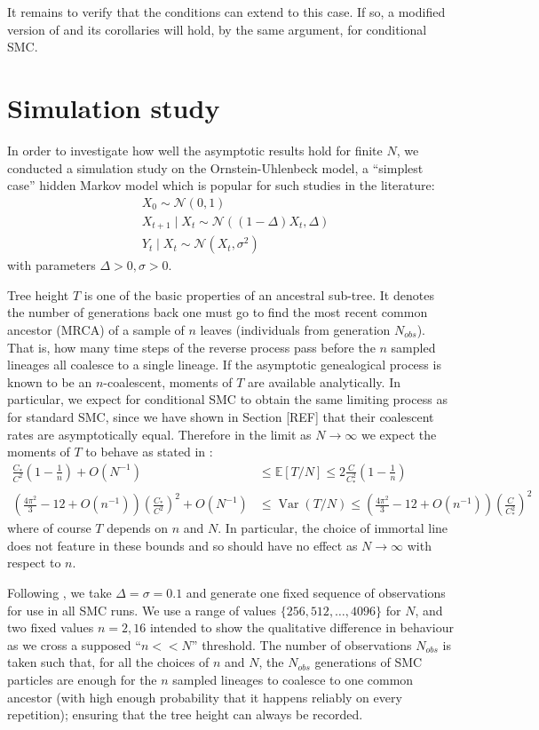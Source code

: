\documentclass{article}
\newcommand{\E}{\mathbb{E}}
\newcommand{\V}{\operatorname{Var}}
\newcommand{\N}{\mathcal{N}}
\begin{document}
It remains to verify that the conditions \citep[(3)--(4)]{koskela2018} can extend to this case. If so, a modified version of \citet[Theorem 1]{koskela2018} and its corollaries will hold, by the same argument, for conditional SMC.

\section{Simulation study}\label{sec:simulations}
In order to investigate how well the asymptotic results hold for finite $N$, we conducted a simulation study on the Ornstein-Uhlenbeck model, a ``simplest case'' hidden Markov model which is popular for such studies in the literature:
\begin{align*}
& X_0 \sim \N(0,1) \\
& X_{t+1} \mid X_t \sim \N((1-\Delta)X_t, \Delta) \\
& Y_t \mid X_{t} \sim \N(X_t, \sigma^2)
\end{align*}
with parameters $\Delta >0, \sigma >0$.

Tree height $T$ is one of the basic properties of an ancestral sub-tree. It denotes the number of generations back one must go to find the most recent common ancestor (MRCA) of a sample of $n$ leaves (individuals from generation $N_{obs}$). That is, how many time steps of the reverse process pass before the $n$ sampled lineages all coalesce to a single lineage. If the asymptotic genealogical process is known to be an $n$-coalescent, moments of $T$ are available analytically. In particular, we expect for conditional SMC to obtain the same limiting process as for standard SMC, since we have shown in Section [REF] that their coalescent rates are asymptotically equal. Therefore in the limit as $N\to\infty$ we expect the moments of $T$ to behave as stated in \citet[Corollary 1]{koskela2018}:
\begin{align*}
\frac{C_*}{C^2} \left(1-\frac{1}{n}\right) + O(N^{-1}) &\leq \E[T/N] \leq 2\frac{C}{C_*^2} \left(1-\frac{1}{n}\right) \\
\left(\frac{4\pi^2}{3} - 12 + O(n^{-1})\right) \left(\frac{C_*}{C^2}\right)^2 + O(N^{-1}) &\leq \V(T/N) \leq \left(\frac{4\pi^2}{3} - 12 + O(n^{-1})\right) \left(\frac{C}{C_*^2}\right)^2
\end{align*}
where of course $T$ depends on $n$ and $N$. In particular, the choice of immortal line does not feature in these bounds and so should have no effect as $N \to\infty$ with respect to $n$.

Following \citet{koskela2018}, we take $\Delta = \sigma = 0.1$ and generate one fixed sequence of observations for use in all SMC runs.
We use a range of values $\{256, 512, \dots, 4096\}$ for $N$, and two fixed values $n=2,16$ intended to show the qualitative difference in behaviour as we cross a supposed ``$n<<N$'' threshold.
The number of observations $N_{obs}$ is taken such that, for all the choices of $n$ and $N$, the $N_{obs}$ generations of SMC particles are enough for the $n$ sampled lineages to coalesce to one common ancestor (with high enough probability that it happens reliably on every repetition); ensuring that the tree height can always be recorded.
\end{document}
